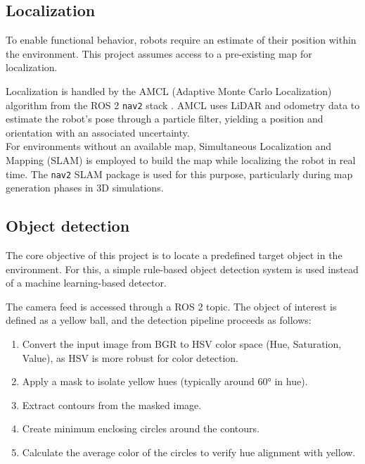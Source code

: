 
\subsection{Localization}
\label{sub:localization} 
To enable functional behavior, robots require an estimate of their position within the environment. This project assumes access to a pre-existing map for localization.

Localization is handled by the AMCL (Adaptive Monte Carlo Localization) algorithm from the ROS 2 \texttt{nav2} stack \cite{nav2, amcl}. AMCL uses LiDAR and odometry data to estimate the robot’s pose through a particle filter, yielding a position and orientation with an associated uncertainty.\\

For environments without an available map, Simultaneous Localization and Mapping (SLAM) is employed to build the map while localizing the robot in real time. The \texttt{nav2} SLAM package is used for this purpose, particularly during map generation phases in 3D simulations.

\subsection{Object detection}
\label{sub:object_detection}
The core objective of this project is to locate a predefined target object in the environment. For this, a simple rule-based object detection system is used instead of a machine learning-based detector.

The camera feed is accessed through a ROS 2 topic. The object of interest is defined as a yellow ball, and the detection pipeline proceeds as follows:
\begin{enumerate}
    \item Convert the input image from BGR to HSV color space (Hue, Saturation, Value), as HSV is more robust for color detection.
    \item Apply a mask to isolate yellow hues (typically around 60° in hue).
    \item Extract contours from the masked image.
    \item Create minimum enclosing circles around the contours.
    \item Calculate the average color of the circles to verify hue alignment with yellow.
\end{enumerate}


